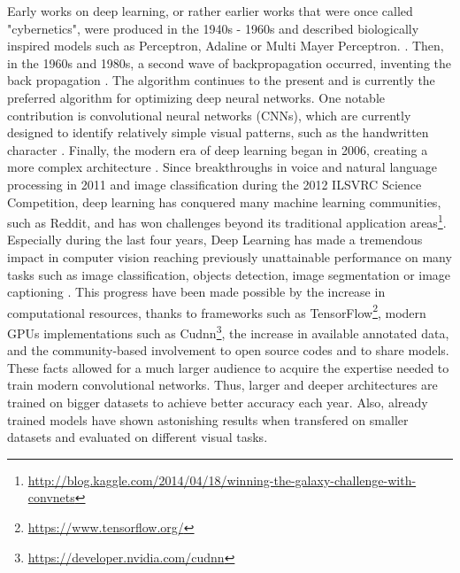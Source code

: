     Early works on deep learning, or rather earlier works that were once called "cybernetics", were produced in the 1940s - 1960s and described biologically inspired models such as Perceptron, Adaline or Multi Mayer Perceptron. \cite{rosenblatt2000probabilistic, schmidhuber2015deep }. Then, in the 1960s and 1980s, a second wave of backpropagation occurred, inventing the back propagation \cite{rumelhart1986learning}. The algorithm continues to the present and is currently the preferred algorithm for optimizing deep neural networks. One notable contribution is convolutional neural networks (CNNs), which are currently designed to identify relatively simple visual patterns, such as the handwritten character \cite{lecun1995convolutional}. Finally, the modern era of deep learning began in 2006, creating a more complex architecture \cite{hinton2006fast, bengio2007greedy, huang2007unsupervised}. Since breakthroughs in voice and natural language processing in 2011 and image classification during the 2012 ILSVRC Science Competition, deep learning has conquered many machine learning communities, such as Reddit, and has won challenges beyond its traditional application areas\footnote{\url{http://blog.kaggle.com/2014/04/18/winning-the-galaxy-challenge-with-convnets}}. \\


    Especially during the last four years, Deep Learning has made a tremendous impact in computer vision reaching previously unattainable performance on many tasks such as image classification, objects detection, image segmentation or image captioning \cite{DBLP:journals/corr/GuWKMSSLWW15}. This progress have been made possible by the increase in computational resources, thanks to frameworks such as TensorFlow\footnote{\url{https://www.tensorflow.org/}}, modern GPUs implementations such as Cudnn\footnote{\url{https://developer.nvidia.com/cudnn}}, the increase in available annotated data, and the community-based involvement to open source codes and to share models. These facts allowed for a much larger audience to acquire the expertise needed to train modern convolutional networks. Thus, larger and deeper architectures are trained on bigger datasets to achieve better accuracy each year. Also, already trained models have shown astonishing results when transfered on smaller datasets and evaluated on different visual tasks. \\

